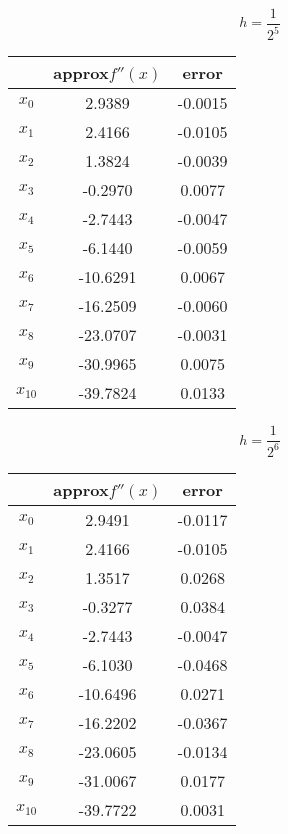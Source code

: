 \documentclass{article}
\begin{document}
$$h=\frac1{2^5}$$
\begin{center}
\begin{tabular}{|c|c|c|}
  \hline
        & approx$f''(x)$ &error\\
  \hline
  $x_0$ &2.9389  &-0.0015\\
  $x_1$ &2.4166  &-0.0105\\
  $x_2$ &1.3824  &-0.0039\\
  $x_3$ &-0.2970  &0.0077\\
  $x_4$ &-2.7443  &-0.0047\\
  $x_5$ &-6.1440  &-0.0059\\
  $x_6$ &-10.6291  &0.0067\\
  $x_7$ &-16.2509  &-0.0060\\
  $x_8$ &-23.0707  &-0.0031\\
  $x_9$ &-30.9965  &0.0075\\
  $x_{10}$ &-39.7824  &0.0133\\
  \hline
\end{tabular}
\end{center}
\newpage
$$h=\frac1{2^6}$$
\begin{center}
\begin{tabular}{|c|c|c|}
  \hline
        & approx$f''(x)$ &error\\
  \hline
  $x_0$ &2.9491  &-0.0117\\
  $x_1$ &2.4166  &-0.0105\\
  $x_2$ &1.3517  &0.0268\\
  $x_3$ &-0.3277  &0.0384\\
  $x_4$ &-2.7443  &-0.0047\\
  $x_5$ &-6.1030  &-0.0468\\
  $x_6$ &-10.6496  &0.0271\\
  $x_7$ &-16.2202  &-0.0367\\
  $x_8$ &-23.0605  &-0.0134\\
  $x_9$ &-31.0067  &0.0177\\
  $x_{10}$ &-39.7722  &0.0031\\
  \hline
\end{tabular}
\end{center}
\end{document}
